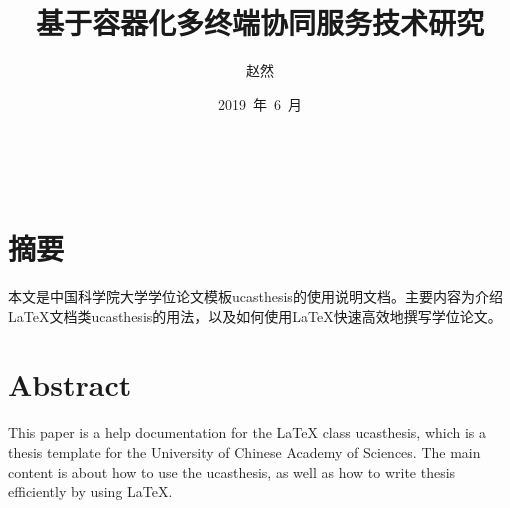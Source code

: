\confidential{}%
\title{基于容器化多终端协同服务技术研究}%
\author{赵然}%
\date{2019~年~6~月}%
\maketitle%
\MAKETITLE%
\makedeclaration%
\chapter*{摘\quad 要}%
\setcounter{page}{1}%

本文是中国科学院大学学位论文模板ucasthesis的使用说明文档。主要内容为介绍\LaTeX{}文档类ucasthesis的用法，以及如何使用\LaTeX{}快速高效地撰写学位论文。

\chapter*{Abstract}%

This paper is a help documentation for the \LaTeX{} class ucasthesis, which is  a thesis template for the University of Chinese Academy of Sciences. The main content is about how to use the ucasthesis, as well as how to write thesis efficiently by using \LaTeX{}.

